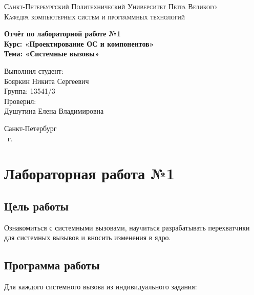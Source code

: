 \documentclass[14pt,a4paper,report]{report}
\begin{document}
\def\contentsname{Содержание}

\begin{titlepage}
	\begin{center}
		\textsc{Санкт-Петербургский Политехнический 
			Университет Петра Великого\\[5mm]
			Кафедра компьютерных систем и программных технологий}
		
		\vfill
		
		\textbf{Отчёт по лабораторной работе №1\\[3mm]
			Курс: «Проектирование ОС и компонентов»\\[3mm]
			Тема: «Системные вызовы»\\[35mm]
			}
	\end{center}
	
	\hfill
	\begin{minipage}{.5\textwidth}
		Выполнил студент:\\[2mm] 
		Бояркин Никита Сергеевич\\
		Группа: 13541/3\\[5mm]
		
		Проверил:\\[2mm] 
		Душутина Елена Владимировна
	\end{minipage}
	\vfill
	\begin{center}
		Санкт-Петербург\\ \the\year\ г.
	\end{center}
\end{titlepage}

\tableofcontents
\clearpage

\chapter{Лабораторная работа №1}

\section{Цель работы}

Ознакомиться с системными вызовами, научиться разрабатывать перехватчики для системных вызывов и вносить изменения в ядро.

\section{Программа работы}

Для каждого системного вызова из индивидуального задания:
\end{document}
